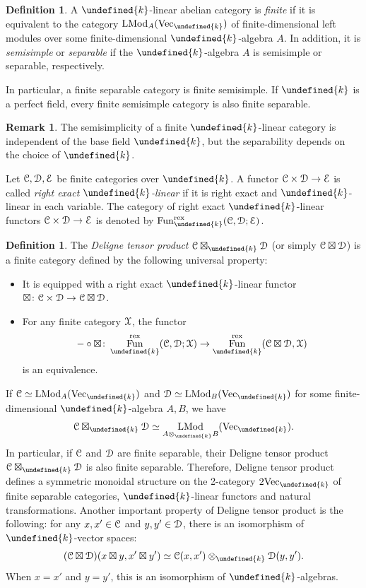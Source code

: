 \documentclass[10pt]{article}
\let\mathbb\undefined
\theoremstyle{definition}
\newtheorem{defn}[thm]{Definition}
\newtheorem{rem}[thm]{Remark}
\numberwithin{equation}{section}
\numberwithin{thm}{section}
\newcommand{\bit}{\begin{itemize}}
\newcommand{\eit}{\end{itemize}}
\newcommand{\bk}{\mathbb{k}}
\newcommand{\CC}{\EuScript{C}}
\newcommand{\CD}{\EuScript{D}}
\newcommand{\CE}{\EuScript{E}}
\newcommand{\CX}{\EuScript{X}}
\DeclareMathOperator{\fun}{Fun}
\DeclareMathOperator{\LMod}{LMod}
\newcommand{\vect}{\mathrm{Vec}}
\newcommand{\rex}{\mathrm{rex}}
\begin{document}
\begin{defn}
A $\bk$-linear abelian category is \emph{finite} if it is equivalent to the category $\LMod_A(\vect_\bk)$ of finite-dimensional left modules over some finite-dimensional $\bk$-algebra $A$. In addition, it is \emph{semisimple} or \emph{separable} if the $\bk$-algebra $A$ is semisimple or separable, respectively.
\end{defn}

In particular, a finite separable category is finite semisimple. If $\bk$ is a perfect field, every finite semisimple category is also finite separable.

\begin{rem}
The semisimplicity of a finite $\bk$-linear category is independent of the base field $\bk$, but the separability depends on the choice of $\bk$.
\end{rem}

Let $\CC,\CD,\CE$ be finite categories over $\bk$. A functor $\CC \times \CD \to \CE$ is called \emph{right exact $\bk$-linear} if it is right exact and $\bk$-linear in each variable. The category of right exact $\bk$-linear functors $\CC \times \CD \to \CE$ is denoted by $\fun_\bk^\rex(\CC,\CD;\CE)$.

\begin{defn}
The \emph{Deligne tensor product} $\CC \boxtimes_\bk \CD$ (or simply $\CC \boxtimes \CD$) is a finite category defined by the following universal property:
\bit
\item It is equipped with a right exact $\bk$-linear functor $\boxtimes \colon \CC \times \CD \to \CC \boxtimes \CD$.
\item For any finite category $\CX$, the functor
\[
- \circ \boxtimes \colon \fun_\bk^\rex(\CC,\CD;\CX) \to \fun_\bk^\rex(\CC \boxtimes \CD,\CX)
\]
is an equivalence.
\eit
\end{defn}

If $\CC \simeq \LMod_A(\vect_\bk)$ and $\CD \simeq \LMod_B(\vect_\bk)$ for some finite-dimensional $\bk$-algebra $A,B$, we have
\[
\CC \boxtimes_\bk \CD \simeq \LMod_{A \otimes_\bk B}(\vect_\bk) .
\]
In particular, if $\CC$ and $\CD$ are finite separable, their Deligne tensor product $\CC \boxtimes_\bk \CD$ is also finite separable. Therefore, Deligne tensor product defines a symmetric monoidal structure on the 2-category $2\vect_\bk$ of finite separable categories, $\bk$-linear functors and natural transformations. Another important property of Deligne tensor product is the following: for any $x,x' \in \CC$ and $y,y' \in \CD$, there is an isomorphism of $\bk$-vector spaces:
\[
(\CC \boxtimes \CD)(x \boxtimes y,x' \boxtimes y') \simeq \CC(x,x') \otimes_\bk \CD(y,y') .
\]
When $x = x'$ and $y = y'$, this is an isomorphism of $\bk$-algebras.
\end{document}
